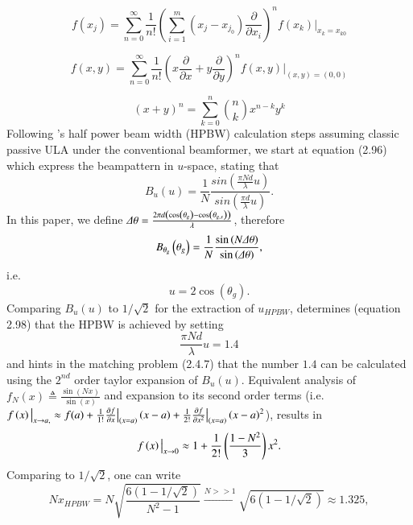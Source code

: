 $$
f(x_j)=\sum_{n=0}^{\infty} \frac 1 {n!}\left(\sum_{i=1}^{m}(x_j-x_{j_0})\frac {\partial}{\partial x_i} \right)^n f(x_k)|_{x_k=x_{k0}}
$$

$$
f(x,y)=\sum_{n=0}^{\infty} \frac 1 {n!}\left(x\frac {\partial}{\partial x}+y\frac {\partial}{\partial y} \right)^n f(x,y)|_{(x,y)=(0,0)}
$$

$$
(x+y)^{n}=\sum _{k=0}^{n}{\binom {n}{k}}x^{n-k}y^{k}
$$
Following \cite{VanTrees2002DetectionIV}'s half power beam width (HPBW) calculation steps assuming classic passive ULA under the conventional beamformer, we start at equation (2.96) which express the beampattern in $u$-space, stating that
$$
B_{u}\left(u\right)=
\frac{1}{N}
\frac{
sin\left(\frac{\pi{}Nd}{\lambda}u\right)
}{
sin\left(\frac{\pi{}d}{\lambda}u\right)
}.
$$
In this paper, we define $\Delta\theta = \frac{2\pi{}d\left(\cos\left(\theta_{g}\right)-\cos\left(\theta_{g,s}\right)\right)}{\lambda}$, therefore
$$
B_{\theta_{g}}\left(\theta_{g}\right)=
\frac{1}{N}
\frac{
\sin\left(N\Delta\theta\right)
}{
\sin\left(\Delta\theta\right)
},
$$
i.e.
\begin{equation}
     u = 2\cos\left(\theta_{g}\right).
\end{equation}
Comparing $B_{u}\left(u\right)$ to $1/\sqrt{2}$ for the extraction of $u_{HPBW}$, \cite{VanTrees2002DetectionIV} determines (equation 2.98) that the HPBW is achieved by setting 
\begin{equation}
    \label{eqn_classicULA_beamwidthCalc_VanTrees_eq_2_98}
    \frac{\pi{}Nd}{\lambda}u = 1.4
\end{equation}
and hints in the matching problem (2.4.7) that the number $1.4$ can be calculated using the $2^{nd}$ order taylor expansion of $B_{u}\left(u\right)$. Equivalent analysis of $ f_{N}\left(x\right)\triangleq\frac{\sin\left(Nx\right)}{\sin\left(x\right)} $ and expansion to its second order terms (i.e.
$
\evalat{f\left(x\right)}{x\to{}a,} \approx 
f(a) + 
\frac{1}{1!}\evalat{\frac{\partial{f}}{\partial{x}}}{\left(x=a\right)}\left(x-a\right) 
+ 
\frac{1}{2!}\evalat{\frac{\partial{f}}{\partial{x^{2}}}}{\left(x=a\right)}\left(x-a\right)^{2}
$), results in
\begin{equation}
    \evalat{f\left(x\right)}{x\to0}
    \approx
    1 + \frac{1}{2!}\left(\frac{1-N^{2}}{3}\right)x^{2}.
\end{equation}
Comparing to $1/\sqrt{2}$, one can write
\begin{equation*}
    Nx_{HPBW} = N\sqrt{\frac{6\left(1-1/\sqrt{2}\right)}{N^{2}-1}}
    \overset{N>>1}{\to} \sqrt{6\left(1-1/\sqrt{2}\right)} \approx 1.325,
\end{equation*}
